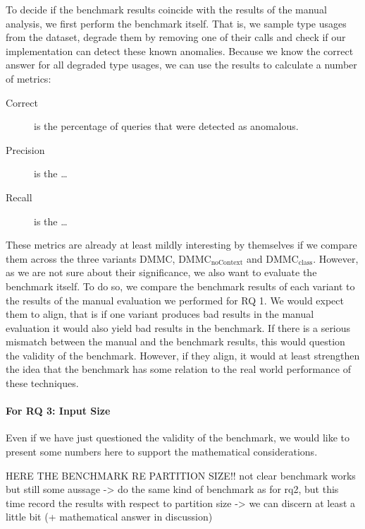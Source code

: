 To decide if the benchmark results coincide with the results of the manual analysis, we first perform the benchmark itself.
That is, we sample type usages from the dataset, degrade them by removing one of their calls and check if our implementation can detect these known anomalies.
Because we know the correct answer for all degraded type usages, we can use the results to calculate a number of metrics:
\begin{description}
    \item [Correct] is the percentage of queries that were detected as anomalous.
    \item [Precision] is the \ldots
    \item [Recall] is the \ldots
\end{description}
These metrics are already at least mildly interesting by themselves if we compare them across the three variants $\text{DMMC}$, $\text{DMMC}_\text{noContext}$ and $\text{DMMC}_\text{class}$.
However, as we are not sure about their significance, we also want to evaluate the benchmark itself.
To do so, we compare the benchmark results of each variant to the results of the manual evaluation we performed for RQ 1.
We would expect them to align, that is if one variant produces bad results in the manual evaluation it would also yield bad results in the benchmark.
If there is a serious mismatch between the manual and the benchmark results, this would question the validity of the benchmark.
However, if they align, it would at least strengthen the idea that the benchmark has some relation to the real world performance of these techniques.


\paragraph{For RQ 3: Input Size}

Even if we have just questioned the validity of the benchmark,
we would like to present some numbers here to support the mathematical considerations.

HERE THE BENCHMARK RE PARTITION SIZE!!
not clear benchmark works
but still some aussage
-> do the same kind of benchmark as for rq2, but this time record the results with respect to partition size
-> we can discern at least a little bit (+ mathematical answer in discussion)

